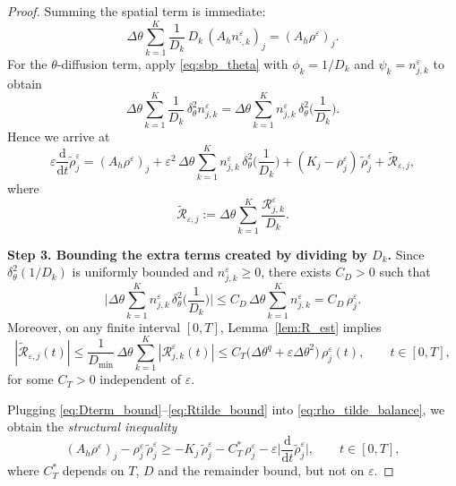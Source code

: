 \documentclass[11pt, dina4, amsfont12]{article}
\begin{document}
\begin{proof}
Summing the spatial term is immediate:
\[
\Delta\theta\sum_{k=1}^K \frac{1}{D_k}\,D_k\,(A_h n_{\cdot,k}^\varepsilon)_j
=
(A_h\rho^\varepsilon)_j.
\]
For the $\theta$-diffusion term, apply \eqref{eq:sbp_theta} with
$\phi_k=1/D_k$ and $\psi_k=n_{j,k}^\varepsilon$ to obtain
\[
\Delta\theta\sum_{k=1}^K \frac{1}{D_k}\,\delta_\theta^2 n_{j,k}^\varepsilon
=
\Delta\theta\sum_{k=1}^K n_{j,k}^\varepsilon\,\delta_\theta^2\!\Big(\frac{1}{D_k}\Big).
\]
Hence we arrive at
\begin{equation}\label{eq:rho_tilde_balance}
\varepsilon \frac{\mathrm d}{\mathrm dt}\widetilde\rho_j^\varepsilon
=
(A_h\rho^\varepsilon)_j
+\varepsilon^2\,\Delta\theta\sum_{k=1}^K n_{j,k}^\varepsilon\,\delta_\theta^2\!\Big(\frac{1}{D_k}\Big)
+(K_j-\rho_j^\varepsilon)\,\widetilde\rho_j^\varepsilon
+\widetilde{\mathcal R}_{\varepsilon,j},
\end{equation}
where
\[
\widetilde{\mathcal R}_{\varepsilon,j}
:=
\Delta\theta\sum_{k=1}^K \frac{\mathcal R_{j,k}^\varepsilon}{D_k}.
\]

\medskip
\noindent
\textbf{Step 3. Bounding the extra terms created by dividing by $D_k$.}
Since $\delta_\theta^2(1/D_k)$ is uniformly bounded and $n_{j,k}^\varepsilon\ge0$,
there exists $C_D>0$ such that
\begin{equation}\label{eq:Dterm_bound}
\Big|
\Delta\theta\sum_{k=1}^K n_{j,k}^\varepsilon\,\delta_\theta^2\!\Big(\frac{1}{D_k}\Big)
\Big|
\le
C_D\,\Delta\theta\sum_{k=1}^K n_{j,k}^\varepsilon
=
C_D\,\rho_j^\varepsilon.
\end{equation}
Moreover, on any finite interval $[0,T]$, Lemma~\ref{lem:R_est} implies
\begin{equation}\label{eq:Rtilde_bound}
|\widetilde{\mathcal R}_{\varepsilon,j}(t)|
\le
\frac{1}{D_{\min}}\,
\Delta\theta\sum_{k=1}^K |\mathcal R_{j,k}^\varepsilon(t)|
\le
C_T\big(\Delta\theta^q+\varepsilon\Delta\theta^2\big)\,\rho_j^\varepsilon(t),
\qquad t\in[0,T],
\end{equation}
for some $C_T>0$ independent of $\varepsilon$.

Plugging \eqref{eq:Dterm_bound}--\eqref{eq:Rtilde_bound} into \eqref{eq:rho_tilde_balance},
we obtain the \emph{structural inequality}
\begin{equation}\label{eq:rho_tilde_ineq}
(A_h\rho^\varepsilon)_j
-\rho_j^\varepsilon\,\widetilde\rho_j^\varepsilon
\ge
- K_j\,\widetilde\rho_j^\varepsilon
- C_T^\ast\,\rho_j^\varepsilon
- \varepsilon \Big|\frac{\mathrm d}{\mathrm dt}\widetilde\rho_j^\varepsilon\Big|,
\qquad t\in[0,T],
\end{equation}
where $C_T^\ast$ depends on $T$, $D$ and the remainder bound, but not on $\varepsilon$.


\end{proof}
\end{document}
